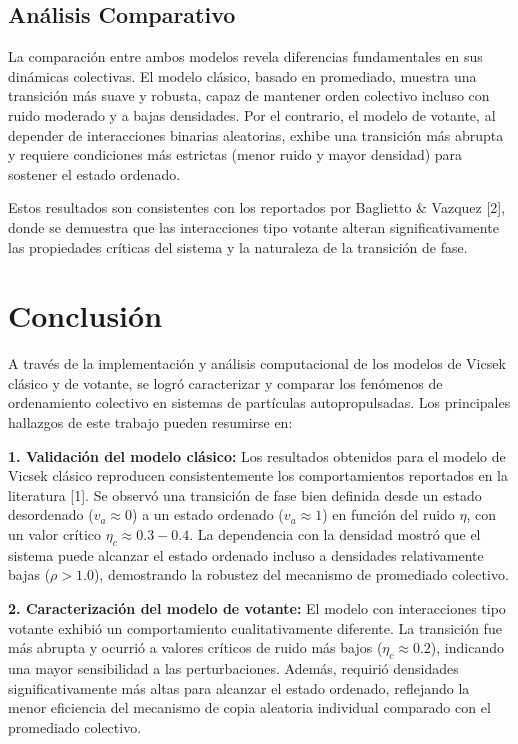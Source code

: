 \documentclass{article}
\begin{document}
\subsection{Análisis Comparativo}
La comparación entre ambos modelos revela diferencias fundamentales en sus dinámicas colectivas. El modelo clásico, basado en promediado, muestra una transición más suave y robusta, capaz de mantener orden colectivo incluso con ruido moderado y a bajas densidades. Por el contrario, el modelo de votante, al depender de interacciones binarias aleatorias, exhibe una transición más abrupta y requiere condiciones más estrictas (menor ruido y mayor densidad) para sostener el estado ordenado.

Estos resultados son consistentes con los reportados por Baglietto \& Vazquez [2], donde se demuestra que las interacciones tipo votante alteran significativamente las propiedades críticas del sistema y la naturaleza de la transición de fase.

\section{Conclusión}

A través de la implementación y análisis computacional de los modelos de Vicsek clásico y de votante, se logró caracterizar y comparar los fenómenos de ordenamiento colectivo en sistemas de partículas autopropulsadas. Los principales hallazgos de este trabajo pueden resumirse en:

\medskip

\textbf{1. Validación del modelo clásico:} Los resultados obtenidos para el modelo de Vicsek clásico reproducen consistentemente los comportamientos reportados en la literatura [1]. Se observó una transición de fase bien definida desde un estado desordenado ($v_a \approx 0$) a un estado ordenado ($v_a \approx 1$) en función del ruido $\eta$, con un valor crítico $\eta_c \approx 0.3-0.4$. La dependencia con la densidad mostró que el sistema puede alcanzar el estado ordenado incluso a densidades relativamente bajas ($\rho > 1.0$), demostrando la robustez del mecanismo de promediado colectivo.

\medskip

\textbf{2. Caracterización del modelo de votante:} El modelo con interacciones tipo votante exhibió un comportamiento cualitativamente diferente. La transición fue más abrupta y ocurrió a valores críticos de ruido más bajos ($\eta_c \approx 0.2$), indicando una mayor sensibilidad a las perturbaciones. Además, requirió densidades significativamente más altas para alcanzar el estado ordenado, reflejando la menor eficiencia del mecanismo de copia aleatoria individual comparado con el promediado colectivo.
\end{document}
